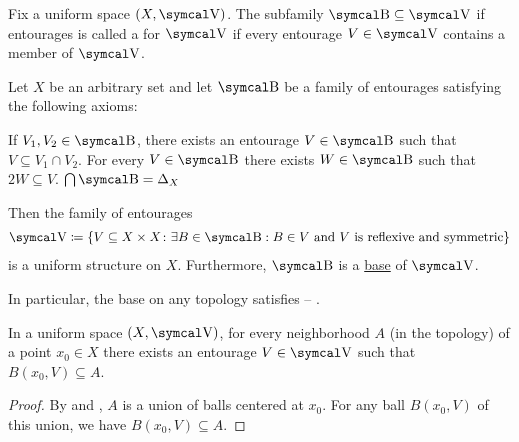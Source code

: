 \begin{Definition}\label{def:uniform_space_base}
  Fix a uniform space \( (X, \CV) \). The subfamily \( \CB \subseteq \CV \) if entourages is called a  for \( \CV \) if every entourage \( V \in \CV \) contains a member of \( \CV \).
\end{Definition}

\begin{Definition}\label{thm:uniform_space_base_axioms}\cite[427, proposition 8.1.14]{Engelking1989}
  Let \( X \) be an arbitrary set and let \( \CB \) be a family of entourages satisfying the following axioms:
  \begin{RefList}
     If \( V_1, V_2 \in \CB \), there exists an entourage \( V \in \CB \) such that \( V \subseteq V_1 \cap V_2 \).
     For every \( V \in \CB \) there exists \( W \in \CB \) such that \( 2W \subseteq V \).
     \( \bigcap \CB = \Delta_X \)
  \end{RefList}

  Then the family of entourages
  \begin{align}\label{thm:uniform_space_base_axioms/uniformity}
    \CV \coloneqq \left\{ V \subseteq X \times X \colon \exists B \in \CB: B \in V \Tand V \text{ is reflexive and symmetric} \right\}
  \end{align}
  is a uniform structure on \( X \). Furthermore, \( \CB \) is a \hyperref[def:uniform_space_base]{base} of \( \CV \).

  In particular, the base on any topology satisfies  -- .
\end{Definition}

\begin{Lemma}\label{thm:uniform_space_neighborhood_contains_ball}
  In a uniform space \( (X, \CV) \), for every neighborhood \( A \) (in the topology) of a point \( x_0 \in X \) there exists an entourage \( V \in \CV \) such that \( B(x_0, V) \subseteq A \).
\end{Lemma}
\begin{proof}
  By  and , \( A \) is a union of balls centered at \( x_0 \). For any ball \( B(x_0, V) \) of this union, we have \( B(x_0, V) \subseteq A \).
\end{proof}

